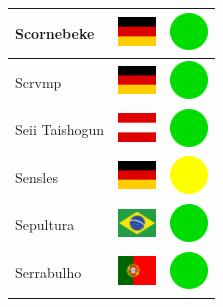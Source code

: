 \documentclass[12pt, a4paper, twoside]{report}
\begin{document}
\begin{center}
\begin{longtable}{|p{5cm}|p{2cm}|p{2cm}|}
 Scornebeke                                                 & \includegraphics[width=1cm]{4x3/de} &   \includegraphics[width=1cm]{likes/y} \\ \hline
 Scrvmp                                                     & \includegraphics[width=1cm]{4x3/de} &   \includegraphics[width=1cm]{likes/y} \\ \hline
 Seii Taishogun                                             & \includegraphics[width=1cm]{4x3/at} &   \includegraphics[width=1cm]{likes/y} \\ \hline
 Sensles                                                    & \includegraphics[width=1cm]{4x3/de} &   \includegraphics[width=1cm]{likes/m} \\ \hline
 Sepultura                                                  & \includegraphics[width=1cm]{4x3/br} &   \includegraphics[width=1cm]{likes/y} \\ \hline
 Serrabulho                                                 & \includegraphics[width=1cm]{4x3/pt} &   \includegraphics[width=1cm]{likes/y} \\ \hline

\end{longtable}
\end{center}
\end{document}

